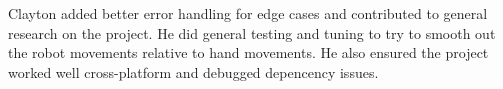 \documentclass{article}
\begin{document}
Clayton added better error handling for edge cases and contributed to general
research on the project. He did general testing and tuning to try to smooth out
the robot movements relative to hand movements. He also ensured the
project worked well cross-platform and debugged depencency issues.

\clearpage


\end{document}
